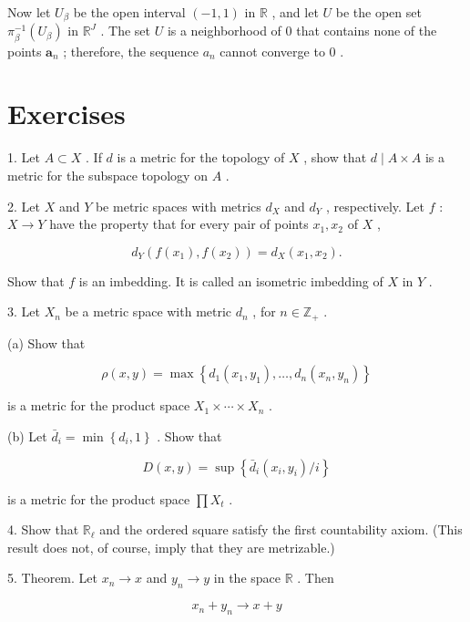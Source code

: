 \documentclass[10pt]{article}
\begin{document}
Now let \({U}_{\beta }\) be the open interval \(\left( {-1,1}\right)\) in \(\mathbb{R}\) , and let \(U\) be the open set \({\pi }_{\beta }^{-1}\left( {U}_{\beta }\right)\) in \({\mathbb{R}}^{J}\) . The set \(U\) is a neighborhood of 0 that contains none of the points \({\mathbf{a}}_{n}\) ; therefore, the sequence \({a}_{n}\) cannot converge to 0 .

\section*{Exercises}

1. Let \(A \subset  X\) . If \(d\) is a metric for the topology of \(X\) , show that \(d \mid  A \times  A\) is a metric for the subspace topology on \(A\) .

2. Let \(X\) and \(Y\) be metric spaces with metrics \({d}_{X}\) and \({d}_{Y}\) , respectively. Let \(f\) : \(X \rightarrow  Y\) have the property that for every pair of points \({x}_{1},{x}_{2}\) of \(X\) ,

\[
{d}_{Y}\left( {f\left( {x}_{1}\right) ,f\left( {x}_{2}\right) }\right)  = {d}_{X}\left( {{x}_{1},{x}_{2}}\right) .
\]

Show that \(f\) is an imbedding. It is called an isometric imbedding of \(X\) in \(Y\) .

3. Let \({X}_{n}\) be a metric space with metric \({d}_{n}\) , for \(n \in  {\mathbb{Z}}_{ + }\) .

(a) Show that

\[
\rho \left( {x,y}\right)  = \max \left\{  {{d}_{1}\left( {{x}_{1},{y}_{1}}\right) ,\ldots ,{d}_{n}\left( {{x}_{n},{y}_{n}}\right) }\right\}
\]

is a metric for the product space \({X}_{1} \times  \cdots  \times  {X}_{n}\) .

(b) Let \({\bar{d}}_{i} = \min \left\{  {{d}_{i},1}\right\}\) . Show that

\[
D\left( {x,y}\right)  = \sup \left\{  {{\bar{d}}_{i}\left( {{x}_{i},{y}_{i}}\right) /i}\right\}
\]

is a metric for the product space \(\prod {X}_{t}\) .

4. Show that \({\mathbb{R}}_{\ell }\) and the ordered square satisfy the first countability axiom. (This result does not, of course, imply that they are metrizable.)

5. Theorem. Let \({x}_{n} \rightarrow  x\) and \({y}_{n} \rightarrow  y\) in the space \(\mathbb{R}\) . Then

\[
{x}_{n} + {y}_{n} \rightarrow  x + y
\]
\end{document}
